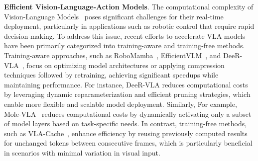 \noindent \textbf{Efficient Vision-Language-Action Models}.
The computational complexity of Vision-Language Models~\citep{liu2025shifting,wen2025stop} poses significant challenges for their real-time deployment, particularly in applications such as robotic control that require rapid decision-making. To address this issue, recent efforts to accelerate VLA models have been primarily categorized into training-aware and training-free methods. Training-aware approaches, such as RoboMamba~\citep{liu2024robomambaefficientvisionlanguageactionmodel}, EfficientVLM~\citep{wang2022efficientvlmfastaccuratevisionlanguage}, and DeeR-VLA~\citep{DeeR-VLA}, focus on optimizing model architectures or applying compression techniques followed by retraining, achieving significant speedups while maintaining performance. For instance, DeeR-VLA reduces computational costs by leveraging dynamic reparameterization and efficient pruning strategies, which enable more flexible and scalable model deployment. Similarly, For example, Mole-VLA~\citep{zhang2025mole} reduces computational costs by dynamically activating only a subset of model layers based on task-specific needs. In contrast, training-free methods, such as VLA-Cache~\citep{xu2025vla}, enhance efficiency by reusing previously computed results for unchanged tokens between consecutive frames, which is particularly beneficial in scenarios with minimal variation in visual input.
